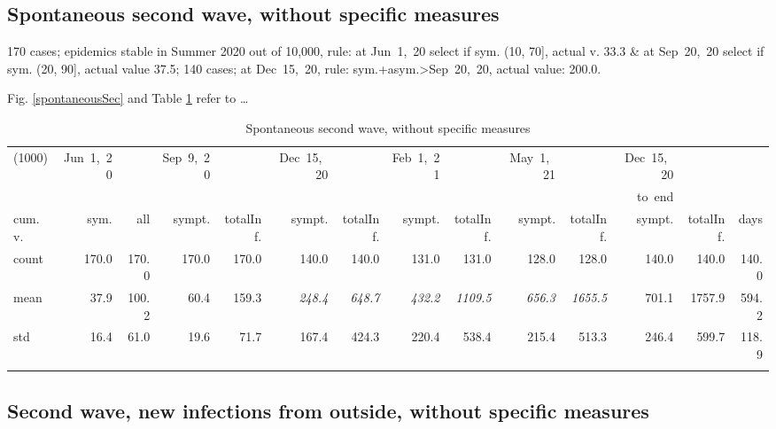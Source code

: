 \documentclass[graybox]{svmult}
\begin{document}
\subsection{Spontaneous second wave, without specific measures}
\label{spont}

170 cases; epidemics stable in Summer 2020 out of 10,000, rule: at Jun~1,~20 select if sym. (10, 70], actual v. 33.3 \& at Sep~20,~20 select if sym. (20, 90], actual value 37.5; 140 cases; at Dec~15,~20, rule: sym.+asym.>Sep~20,~20, actual value: 200.0.

Fig. \ref{spontaneousSec} and Table \ref{selSpontWave2Tab} refer to \ldots

\begin{table}[t]
\center
\tiny
\begin{tabular}{lrrrrrrrrrrrrr}
\hline\noalign{\smallskip}
(1000) & Jun~1,~20 & & Sep~9,~20 & & Dec~15,~20 & & Feb~1,~21 & & May~1,~21 & & Dec~15,~20 \\
& & & & & & & & & & & to~end \\
cum.~v. & sym. & all & sympt. & totalInf. & sympt. & totalInf. & sympt. & totalInf. & sympt. & totalInf. & sympt. & totalInf. & days\\
\noalign{\smallskip}\svhline\noalign{\smallskip}
count & 170.0 & 170.0 & 170.0 & 170.0 & 140.0 & 140.0 & 131.0 & 131.0 & 128.0 & 128.0 & 140.0 & 140.0 & 140.0 \\
mean & 37.9 & 100.2 & 60.4 & 159.3 & \emph{248.4} & \emph{648.7} & \emph{432.2} & \emph{1109.5} & \emph{656.3} & \emph{1655.5} & 701.1 & 1757.9 & 594.2 \\
std & 16.4 & 61.0 & 19.6 & 71.7 & 167.4 & 424.3 & 220.4 & 538.4 & 215.4 & 513.3 & 246.4 & 599.7 & 118.9 \\
\hline\noalign{\smallskip}
\end{tabular}
\caption{Spontaneous second wave, without specific measures}
\label{selSpontWave2Tab}
\end{table}

\subsection{Second wave, new infections from outside, without specific measures}
\label{secondWithout}
\end{document}
